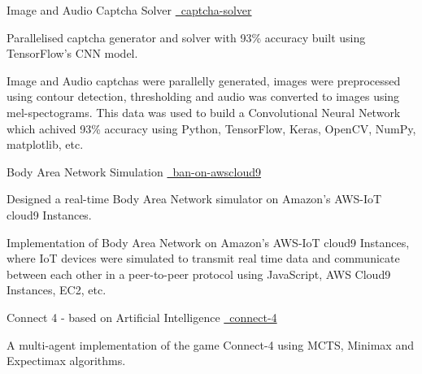 \begin{cventries}
   \cvproject
    {Image and Audio Captcha Solver}
    {
    {}
    {\href{https://github.com/mukeshmk/image-audio-captcha}
    {\faGithubSquare\ captcha-solver}}
    }
    {}
    {
      \begin{cvitems}
      \vspace{-0.5ex}
        {
        \item {Parallelised captcha generator and solver with 93\% accuracy built using TensorFlow’s CNN model.}
        }
        {
        Image and Audio captchas were parallelly generated, images were preprocessed using contour detection, thresholding and audio was converted to images using mel-spectograms. This data was used to build a Convolutional Neural Network which achived 93\% accuracy using Python, TensorFlow, Keras, OpenCV, NumPy, matplotlib, etc.
        }
      \end{cvitems}
    }
  \cvproject
    {Body Area Network Simulation}
    {
    {}
    {\href{https://github.com/mukeshmk/ban-on-awscloud9}{\faGithubSquare\ ban-on-awscloud9}}
    }
    {}
    {
       \begin{cvitems}
       \vspace{-0.5ex}
        {
        \item{Designed a real-time Body Area Network simulator on Amazon's AWS-IoT cloud9 Instances.}
        }
        {
        Implementation of Body Area Network on Amazon's AWS-IoT cloud9 Instances, where IoT devices were simulated to transmit real time data and communicate between each other in a peer-to-peer protocol using JavaScript, AWS Cloud9 Instances, EC2, etc.
        }
      \end{cvitems}
    }
  \cvproject
    {Connect 4 - based on Artificial Intelligence}
    {
    {}
    {\href{https://github.com/mukeshmk/connect-4}{\faGithubSquare\ connect-4}}
    }
    {}
    {
      \begin{cvitems}
      \vspace{-0.5ex}
      {
      \item {A multi-agent implementation of the game Connect-4 using MCTS, Minimax and Expectimax algorithms.} 
      }

\end{cvitems}}
\end{cventries}
